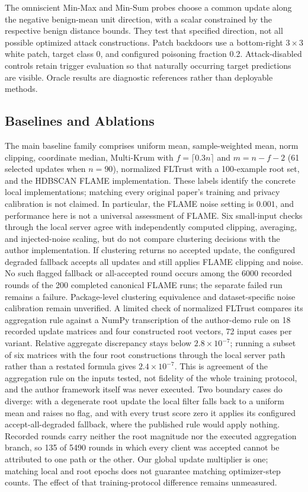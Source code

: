 \documentclass[journal]{IEEEtran}
\begin{document}
The omniscient Min-Max and Min-Sum probes choose a common update along the negative benign-mean unit direction, with a scalar constrained by the respective benign distance bounds. They test that specified direction, not all possible optimized attack constructions. Patch backdoors use a bottom-right $3\times3$ white patch, target class 0, and configured poisoning fraction 0.2. Attack-disabled controls retain trigger evaluation so that naturally occurring target predictions are visible. Oracle results are diagnostic references rather than deployable methods.

\subsection{Baselines and Ablations}
The main baseline family comprises uniform mean, sample-weighted mean, norm clipping, coordinate median, Multi-Krum with $f=\lceil0.3n\rceil$ and $m=n-f-2$ (61 selected updates when $n=90$), normalized FLTrust with a 100-example root set, and the HDBSCAN FLAME implementation. These labels identify the concrete local implementations; matching every original paper's training and privacy calibration is not claimed. In particular, the FLAME noise setting is $0.001$, and performance here is not a universal assessment of FLAME. Six small-input checks through the local server agree with independently computed clipping, averaging, and injected-noise scaling, but do not compare clustering decisions with the author implementation. If clustering returns no accepted update, the configured degraded fallback accepts all updates and still applies FLAME clipping and noise. No such flagged fallback or all-accepted round occurs among the 6000 recorded rounds of the 200 completed canonical FLAME runs; the separate failed run remains a failure. Package-level clustering equivalence and dataset-specific noise calibration remain unverified. A limited check of normalized FLTrust compares its aggregation rule against a NumPy transcription of the author-demo rule on 18 recorded update matrices and four constructed root vectors, 72 input cases per variant. Relative aggregate discrepancy stays below $2.8\times10^{-7}$; running a subset of six matrices with the four root constructions through the local server path rather than a restated formula gives $2.4\times10^{-7}$. This is agreement of the aggregation rule on the inputs tested, not fidelity of the whole training protocol, and the author framework itself was never executed. Two boundary cases do diverge: with a degenerate root update the local filter falls back to a uniform mean and raises no flag, and with every trust score zero it applies its configured accept-all-degraded fallback, where the published rule would apply nothing. Recorded rounds carry neither the root magnitude nor the executed aggregation branch, so 135 of 5490 rounds in which every client was accepted cannot be attributed to one path or the other. Our global update multiplier is one; matching local and root epochs does not guarantee matching optimizer-step counts. The effect of that training-protocol difference remains unmeasured.
\end{document}
